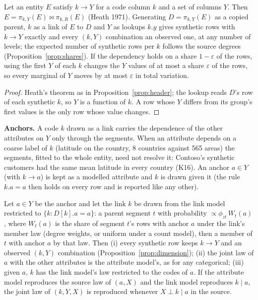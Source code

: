 \begin{proposition}\label{prop:dimension}
Let an entity $E$ satisfy $k\to Y$ for a code column $k$ and a set of columns $Y$. Then $E=\pi_{k,Y}(E)\bowtie\pi_{k,R}(E)$ (Heath 1971). Generating $D=\pi_{k,Y}(E)$ as a copied parent, $k$ as a link of $E$ to $D$ and $Y$ as lookups $k.y$ gives synthetic rows with $k\to Y$ exactly and every $(k,Y)$ combination an observed one, at any number of levels; the expected number of synthetic rows per $k$ follows the source degrees (Proposition~\ref{prop:shares}). If the dependency holds on a share $1-\varepsilon$ of the rows, using the first $Y$ of each $k$ changes the $Y$ values of at most a share $\varepsilon$ of the rows, so every marginal of $Y$ moves by at most $\varepsilon$ in total variation.
\end{proposition}
\begin{proof}
Heath's theorem as in Proposition~\ref{prop:header}; the lookup reads $D$'s row of each synthetic $k$, so $Y$ is a function of $k$. A row whose $Y$ differs from its group's first values is the only row whose value changes.
\end{proof}
\noindent\textbf{Anchors.} A code $k$ drawn as a link carries the dependence of the other attributes on $Y$ only through the segments. When an attribute depends on a coarse label of $k$ (latitude on the country, 8 countries against 565 areas) the segments, fitted to the whole entity, need not resolve it: Contoso's synthetic customers had the same mean latitude in every country (K16). An anchor $a\in Y$ (with $k\to a$) is kept as a modelled attribute and $k$ is drawn given it (the rule $k.a=a$ then holds on every row and is reported like any other).
\begin{proposition}\label{prop:anchor}
Let $a\in Y$ be the anchor and let the link $k$ be drawn from the link model restricted to $\{k: D[k].a=a\}$: a parent segment $t$ with probability $\propto\phi_{z t}\,W_t(a)$, where $W_t(a)$ is the share of segment $t$'s rows with anchor $a$ under the link's member law (degree weights, or uniform under a count model), then a member of $t$ with anchor $a$ by that law. Then (i) every synthetic row keeps $k\to Y$ and an observed $(k,Y)$ combination (Proposition~\ref{prop:dimension}); (ii) the joint law of $a$ with the other attributes is the attribute model's, as for any categorical; (iii) given $a$, $k$ has the link model's law restricted to the codes of $a$. If the attribute model reproduces the source law of $(a,X)$ and the link model reproduces $k\mid a$, the joint law of $(k,Y,X)$ is reproduced whenever $X\perp k\mid a$ in the source.
\end{proposition}
